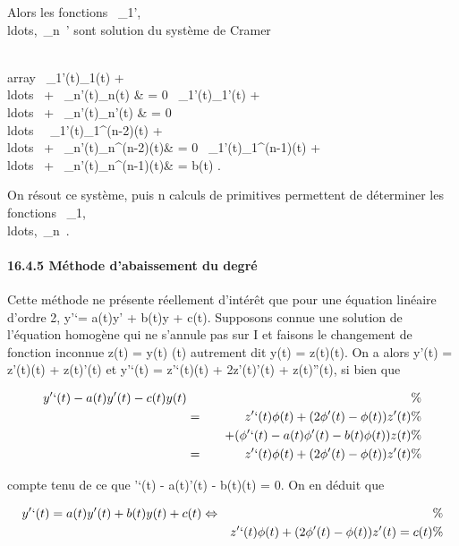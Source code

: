 \documentclass[]{article}
\begin{document}
Alors les fonctions
\lambda~\_1',\\ldots,\lambda~\_n~'
sont solution du système de Cramer

\left \\array
\lambda~\_1'(t)\phi\_1(t) +
\\ldots~ +
\lambda~\_n'(t)\phi\_n(t) & = 0 \cr
\lambda~\_1'(t)\phi\_1'(t) +
\\ldots~ +
\lambda~\_n'(t)\phi\_n'(t) & = 0\cr
\\ldots~
\cr \lambda~\_1'(t)\phi\_1^(n-2)(t) +
\\ldots~ +
\lambda~\_n'(t)\phi\_n^(n-2)(t)& = 0 \cr
\lambda~\_1'(t)\phi\_1^(n-1)(t) +
\\ldots~ +
\lambda~\_n'(t)\phi\_n^(n-1)(t)& = b(t) 
\right .

On résout ce système, puis n calculs de primitives permettent de
déterminer les fonctions
\lambda~\_1,\\ldots,\lambda~\_n~.

\paragraph{16.4.5 Méthode d'abaissement du degré}

Cette méthode ne présente réellement d'intérêt que pour une équation
linéaire d'ordre 2, y'`= a(t)y' + b(t)y + c(t). Supposons connue une
solution \phi de l'équation homogène qui ne s'annule pas sur I et faisons
le changement de fonction inconnue z(t) = y(t) \over
\phi(t) autrement dit y(t) = z(t)\phi(t). On a alors y'(t) = z'(t)\phi(t) +
z(t)\phi'(t) et y'`(t) = z'`(t)\phi(t) + 2z'(t)\phi'(t) + z(t)\phi''(t), si bien que

\begin{align*} y'`(t) - a(t)y'(t) - c(t)y(t)&&
\%& \\ & =& z'`(t)\phi(t) + (2\phi'(t) -
\phi(t))z'(t) \%& \\ & &
\quad + (\phi'`(t) - a(t)\phi'(t) - b(t)\phi(t))z(t)\%&
\\ & =& z'`(t)\phi(t) + (2\phi'(t) -
\phi(t))z'(t) \%& \\
\end{align*}

compte tenu de ce que \phi'`(t) - a(t)\phi'(t) - b(t)\phi(t) = 0. On en déduit
que

\begin{align*} y'`(t) = a(t)y'(t) + b(t)y(t) + c(t)
\Leftrightarrow&& \%& \\
& & z'`(t)\phi(t) + (2\phi'(t) - \phi(t))z'(t) = c(t)\%&
\\ \end{align*}
\end{document}
